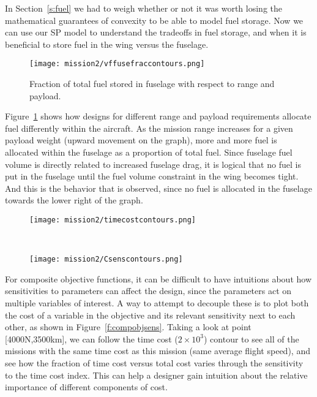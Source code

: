 In Section~\ref{s:fuel} we had to weigh whether or not it was worth losing the mathematical
guarantees of convexity to be able to model fuel storage. Now we can use our \gls{SP} model to understand
the tradeoffs in fuel storage, and when it is beneficial to store fuel in the wing versus the fuselage.

\begin{figure}
    \centering
    \texttt{[image: mission2/vffusefraccontours.png]}
    \caption{Fraction of total fuel stored in fuselage with respect to range and payload.}
    \label{f:fusefuelfrac}
\end{figure}

Figure~\ref{f:fusefuelfrac} shows how designs for different range and payload requirements
allocate fuel differently within the aircraft. As the mission range increases for a given payload weight
(upward movement on the graph),
more and more fuel is allocated within the fuselage as a proportion of total fuel. Since fuselage fuel
volume is directly related to increased fuselage drag, it is logical that no fuel is put in the fuselage
until the fuel volume constraint in the wing becomes tight. And this is the behavior that is observed,
since no fuel is allocated in the fuselage towards the lower right of the graph.

\begin{figure*}[t!]
    \centering
    \begin{subfigure}[t]{0.5\linewidth}
        \centering
        \texttt{[image: mission2/timecostcontours.png]}
    \end{subfigure}%
    ~
    \begin{subfigure}[t]{0.5\linewidth}
        \centering
        \texttt{[image: mission2/Csenscontours.png]}
    \end{subfigure}
    \caption[Time cost and time cost index sensitivity contours.]{Time cost and time cost index sensitivity contours.
    We can gain intuition about the relative importance of different components
    of composite objective functions by showing both the costs and their sensitivities together.}
    \label{f:compobjsens}
\end{figure*}

For composite objective functions, it can be difficult to have intuitions about how sensitivities
to parameters can affect the design, since the parameters act on multiple variables of interest. A way
to attempt to decouple these is to plot both the cost of a variable in the objective and its relevant
sensitivity next to each other, as shown in Figure~\ref{f:compobjsens}. Taking a look at point [4000N,3500km],
we can follow the time cost ($2 \times 10^3$) contour to see all of the missions with the same time cost as this mission
(same average flight speed),
and see how the fraction of time cost versus total cost varies through the sensitivity to the time cost index.
This can help a designer gain intuition about the relative importance of different components of cost.

